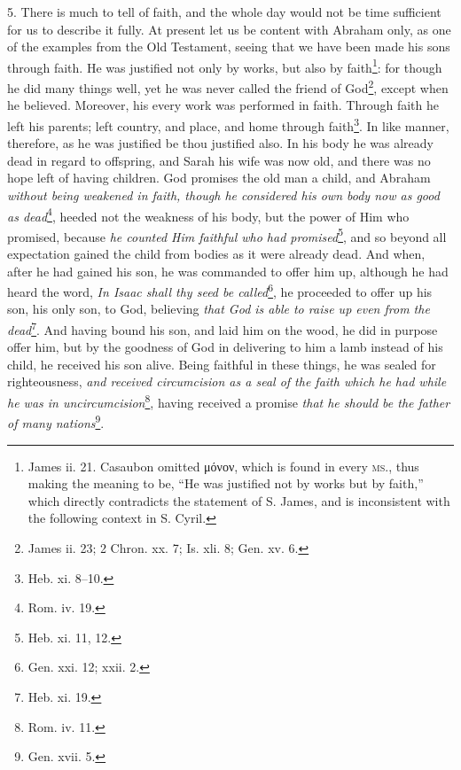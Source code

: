 5. There is much to tell of faith, and the whole day would not be time sufficient for us to describe it fully. At present let us be content with Abraham only, as one of the examples from the Old Testament, seeing that we have been made his sons through faith. He was justified not only by works, but also by faith\footnote{James ii. 21. Casaubon omitted \textgreek{μόνον}, which is found in every \textsc{ms.,} thus making the meaning to be, “He was justified not by works but by faith,” which directly contradicts the statement of S. James, and is inconsistent with the following context in S. Cyril.}: for though he did many things well, yet he was never called the friend of God\footnote{James ii. 23; 2 Chron. xx. 7; Is. xli. 8; Gen. xv. 6.}, except when he believed. Moreover, his every work was performed in faith. Through faith he left his parents; left country, and place, and home through faith\footnote{Heb. xi. 8–10.}. In like manner, therefore, as he was justified be thou justified also. In his body he was already dead in regard to offspring, and Sarah his wife was now old, and there was no hope left of having children. God promises the old man a child, and Abraham \emph{without being weakened in faith, though he considered his own body now as good as dead}\footnote{Rom. iv. 19.}, heeded not the weakness of his body, but the power of Him who promised, because \emph{he counted Him faithful who had promised}\footnote{Heb. xi. 11, 12.}, and so beyond all expectation gained the child from bodies as it were already dead. And when, after he had gained his son, he was commanded to offer him up, although he had heard the word, \emph{In Isaac shall thy seed be called}\footnote{Gen. xxi. 12; xxii. 2.}, he proceeded to offer up his son, his only son, to God, believing \emph{that God is able to raise up even from the dead}\footnote{Heb. xi. 19.}. And having bound his son, and laid him on the wood, he did in purpose offer him, but by the goodness of God in delivering to him a lamb instead of his child, he received his son alive. Being faithful in these things, he was sealed for righteousness, \emph{and received circumcision as a seal of the faith which he had while he was in uncircumcision}\footnote{Rom. iv. 11.}, having received a promise \emph{that he should be the father of many nations}\footnote{Gen. xvii. 5.}.

